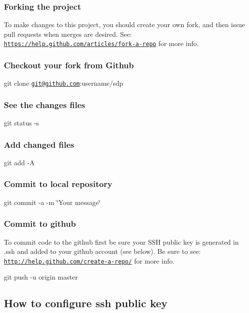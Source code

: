 \subsubsection*{Forking the project}

To make changes to this project, you should create your own fork, and then issue pull requests when merges are desired. See\-: \href{https://help.github.com/articles/fork-a-repo}{\tt https\-://help.\-github.\-com/articles/fork-\/a-\/repo} for more info.

\subsubsection*{Checkout your fork from Github}

git clone \href{mailto:git@github.com}{\tt git@github.\-com}\-:username/sdp

\subsubsection*{See the changes files}

git status -\/s

\subsubsection*{Add changed files}

git add -\/\-A

\subsubsection*{Commit to local repository}

git commit -\/a -\/m \char`\"{}\-Your message\char`\"{}

\subsubsection*{Commit to github}

To commit code to the github first be sure your S\-S\-H public key is generated in .ssh and added to your github account (see below). Be sure to see\-: \href{http://help.github.com/create-a-repo/}{\tt http\-://help.\-github.\-com/create-\/a-\/repo/} for more info. \begin{DoxyVerb}git push -u origin master
\end{DoxyVerb}


\subsection*{How to configure ssh public key }

